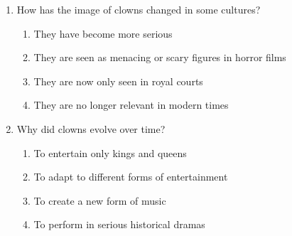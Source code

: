 \documentclass[12pt]{article}
\begin{document}
\begin{enumerate}
    \vspace{0.5cm}

    \item How has the image of clowns changed in some cultures?

    \begin{enumerate}[label=\Alph*.]
        \item They have become more serious
        \item They are seen as menacing or scary figures in horror films
        \item They are now only seen in royal courts
        \item They are no longer relevant in modern times
    \end{enumerate}
    
    \vspace{0.5cm}

    \item Why did clowns evolve over time?

    \begin{enumerate}[label=\Alph*.]
        \item To entertain only kings and queens
        \item To adapt to different forms of entertainment
        \item To create a new form of music
        \item To perform in serious historical dramas
    \end{enumerate}
    
\end{enumerate}
\end{document}
